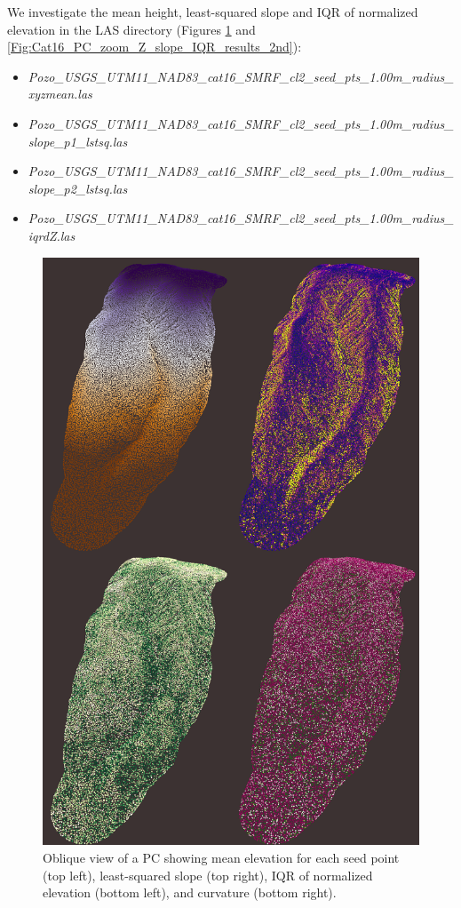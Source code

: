 \documentclass[a4paperpaper,,tablecaptionabove]{scrartcl}
\providecommand{\tightlist}{%
  \setlength{\itemsep}{0pt}\setlength{\parskip}{0pt}}
\begin{document}
We investigate the mean height, least-squared slope and IQR of
normalized elevation in the LAS directory (Figures
\ref{Fig:Cat16_PC_zoom_Z_slope_IQR_results} and
\ref{Fig:Cat16_PC_zoom_Z_slope_IQR_results_2nd}):

\begin{itemize}
\tightlist
\item
  \emph{Pozo\_USGS\_UTM11\_NAD83\_cat16\_SMRF\_cl2\_seed\_pts\_1.00m\_radius\_xyzmean.las}
\item
  \emph{Pozo\_USGS\_UTM11\_NAD83\_cat16\_SMRF\_cl2\_seed\_pts\_1.00m\_radius\_slope\_p1\_lstsq.las}
\item
  \emph{Pozo\_USGS\_UTM11\_NAD83\_cat16\_SMRF\_cl2\_seed\_pts\_1.00m\_radius\_slope\_p2\_lstsq.las}
\item
  \emph{Pozo\_USGS\_UTM11\_NAD83\_cat16\_SMRF\_cl2\_seed\_pts\_1.00m\_radius\_iqrdZ.las}
\end{itemize}

\begin{figure}
\centering
\includegraphics[width=\textwidth,height=0.9\textheight]{./tex2pdf.-e6884bf2dada0f3b/6aedeb92c55ca2f9969ecdcbbd599856016ed156.png}
\caption{Oblique view of a PC showing mean elevation for each seed point
(top left), least-squared slope (top right), IQR of normalized elevation
(bottom left), and curvature (bottom right).
\label{Fig:Cat16_PC_zoom_Z_slope_IQR_results}}
\end{figure}
\end{document}
